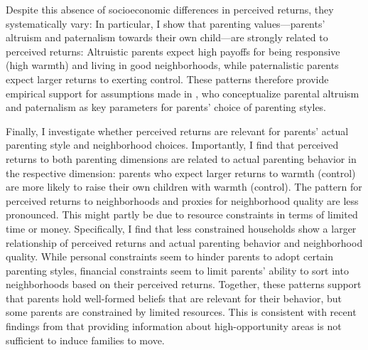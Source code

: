 \documentclass[12pt, a4paper, english]{article}
\begin{document}
Despite this absence of socioeconomic differences in perceived returns, they systematically vary: In particular, I show that parenting values---parents' altruism and paternalism towards their own child---are strongly related to perceived returns: Altruistic parents expect high payoffs for being responsive (high warmth) and living in good neighborhoods, while paternalistic parents expect larger returns to exerting control. These patterns therefore provide empirical support for assumptions made in \citet{DoepkeZilibotti2017}, who conceptualize parental altruism and paternalism as key parameters for parents' choice of parenting styles.

Finally, I investigate whether perceived returns are relevant for parents' actual parenting style and neighborhood choices. Importantly, I find that perceived returns to both parenting dimensions are related to actual parenting behavior in the respective dimension: parents who expect larger returns to warmth (control) are more likely to raise their own children with warmth (control). The pattern for perceived returns to neighborhoods and proxies for neighborhood quality are less pronounced. This might partly be due to resource constraints in terms of limited time or money. Specifically, I find that less constrained households show a larger relationship of perceived returns and actual parenting behavior and neighborhood quality. While personal constraints seem to hinder parents to adopt certain parenting styles, financial constraints seem to limit parents' ability to sort into neighborhoods based on their perceived returns. Together, these patterns support that parents hold well-formed beliefs that are relevant for their behavior, but some parents are constrained by limited resources. This is consistent with recent findings from \citet{Bergmannetal2020CMTO} that providing information about high-opportunity areas is not sufficient to induce families to move.
\end{document}
